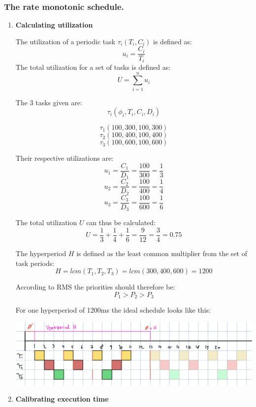 \setcounter{section}{3}
\setcounter{subsection}{3}
\setcounter{subsubsection}{1}
\subsubsection{The rate monotonic schedule.}

\begin{enumerate}[label=\textbf{\arabic*})]
\item \textbf{Calculating utilization}

The utilization of a periodic task $\tau_i(T_i,C_i)$ is defined as:
\[u_i = \frac{C_i}{T_i}\]
The total utilization for a set of tasks is defined as:
\[U = \sum_{i=1}^{n} u_i\]

The 3 tasks given are:
\[\tau_i(\phi_i, T_i, C_i, D_i)\]

\[\tau_1(100, 300, 100, 300)\]
\[\tau_2(100, 400, 100, 400)\]
\[\tau_3(100, 600, 100, 600)\]

Their respective utilizations are:
\[u_1 = \frac{C_1}{D_1} = \frac{100}{300} = \frac{1}{3}\]
\[u_2 = \frac{C_2}{D_2} = \frac{100}{400} = \frac{1}{4}\]
\[u_3 = \frac{C_3}{D_3} = \frac{100}{600} = \frac{1}{6}\]

The total utilization $U$ can thus be calculated:
\[U = \frac{1}{3} + \frac{1}{4} + \frac{1}{6} = \frac{9}{12} = \frac{3}{4} = 0.75\]

The hyperperiod $H$ is defined as the least common multiplier from the set of task periods:
\[H = lcm(T_1, T_2, T_3) = lcm (300, 400, 600) = 1200\]

According to RMS the priorities should therefore be:
\[P_1 > P_2 > P_3\]

For one hyperperiod of 1200ms the ideal schedule looks like this:

\includegraphics[width=\linewidth]{1-rate-monotonic-schedule}

\item \textbf{Calibrating execution time}


\end{enumerate}
